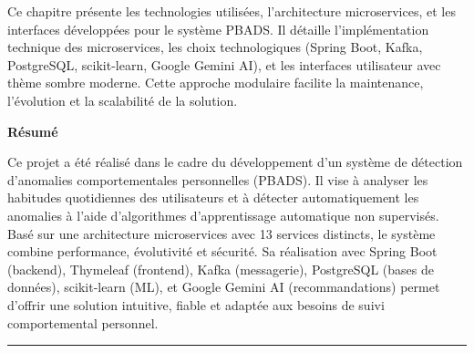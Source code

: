 \documentclass[
    12pt,
    a4paper,
    oneside
]{report}
\begin{document}
\begin{flushright}
\begin{minipage}{0.6\textwidth}
Ce chapitre présente les technologies utilisées, l'architecture microservices, et les interfaces développées pour le système PBADS. Il détaille l'implémentation technique des microservices, les choix technologiques (Spring Boot, Kafka, PostgreSQL, scikit-learn, Google Gemini AI), et les interfaces utilisateur avec thème sombre moderne. Cette approche modulaire facilite la maintenance, l'évolution et la scalabilité de la solution.
\end{minipage}
\end{flushright}
\clearpage

\clearpage

\clearpage
\nocite{*}
\printbibliography[heading=bibintoc, title={Bibliographie}]

\clearpage
\thispagestyle{empty} %

\begin{center}
    {\large\bfseries Résumé}
\end{center}
\vspace{0.5em}
\justifying
Ce projet a été réalisé dans le cadre du développement d'un système de détection d'anomalies comportementales personnelles (PBADS). Il vise à analyser les habitudes quotidiennes des utilisateurs et à détecter automatiquement les anomalies à l'aide d'algorithmes d'apprentissage automatique non supervisés. Basé sur une architecture microservices avec 13 services distincts, le système combine performance, évolutivité et sécurité. Sa réalisation avec Spring Boot (backend), Thymeleaf (frontend), Kafka (messagerie), PostgreSQL (bases de données), scikit-learn (ML), et Google Gemini AI (recommandations) permet d'offrir une solution intuitive, fiable et adaptée aux besoins de suivi comportemental personnel.

\bigskip
\hrule
\bigskip
\end{document}
